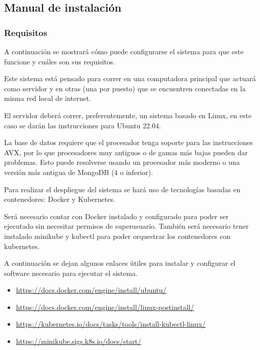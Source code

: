 \documentclass[twoside]{article}
\begin{document}
\newpage
\subsection{Manual de instalación}
\subsubsection{Requisitos}
A continuación se mostrará cómo puede configurarse el sistema para que este funcione y cuáles son sus requisitos.

Este sistema está pensado para correr en una computadora principal que actuará como servidor y en otras (una por puesto) que se encuentren conectadas en la misma red local de internet.

El servidor deberá correr, preferentemente, un sistema basado en Linux, en este caso se darán las instrucciones para Ubuntu 22.04.

La base de datos requiere que el procesador tenga soporte para las instrucciones AVX, por lo que procesadores muy antiguos o de gamas más bajas pueden dar problemas. Esto puede resolverse usando un procesador más moderno o una versión más antigua de MongoDB (4 o inferior).

Para realizar el despliegue del sistema se hará uso de tecnologías basadas en contenedores: Docker y Kubernetes.

Será necesario contar con Docker instalado y configurado para poder ser ejecutado sin necesitar permisos de superusuario. También será necesario tener instalado minikube y kubectl para poder orquestrar los contenedores con kubernetes.

A continuación se dejan algunos enlaces útiles para instalar y configurar el software necesario para ejecutar el sistema.

\begin{itemize}
    \item \href{https://docs.docker.com/engine/install/ubuntu/}{https://docs.docker.com/engine/install/ubuntu/}
    \item \href{https://docs.docker.com/engine/install/linux-postinstall/}{https://docs.docker.com/engine/install/linux-postinstall/}
    \item \href{https://kubernetes.io/docs/tasks/tools/install-kubectl-linux/}{https://kubernetes.io/docs/tasks/tools/install-kubectl-linux/}
    \item \href{https://minikube.sigs.k8s.io/docs/start/}{https://minikube.sigs.k8s.io/docs/start/}
\end{itemize}
\end{document}
